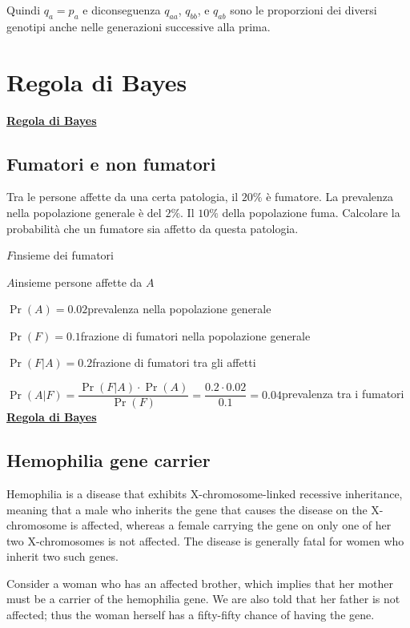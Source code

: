 \documentclass[11pt,openany]{book}
\begin{document}
Quindi $q_a=p_a$ e diconseguenza $q_{aa}$, $q_{bb}$, e $q_{ab}$ sono le proporzioni dei diversi genotipi anche nelle generazioni successive alla prima.


\clearpage\section{Regola di Bayes}
\label{Bayes}
\hfill\textbf{{\color{brown}\hyperref[RegolaBayes]{Regola di Bayes} \faShare}}
\subsection{Fumatori e non fumatori}
\label{Fumatori_Bayes}


Tra le persone affette da una certa patologia, il $20\%$ è fumatore. La prevalenza nella popolazione generale è del $2\%$. Il $10\%$ della popolazione fuma. Calcolare la probabilità che un fumatore sia affetto da questa patologia.


$F$\hfill insieme dei fumatori

$A$\hfill insieme persone affette da $A$

$\Pr(A)=0.02$\hfill prevalenza nella popolazione generale

$\Pr(F)=0.1$\hfill frazione di fumatori nella popolazione generale

$\Pr(F|A)=0.2$\hfill frazione di fumatori tra gli affetti

$\Pr(A|F)=\dfrac{\Pr(F|A)\cdot \Pr(A)}{\Pr(F)}=\dfrac{0.2\cdot0.02}{0.1}=0.04$\hfill prevalenza tra i fumatori
\clearpage\hfill
\hfill\textbf{{\color{brown}\hyperref[RegolaBayes]{Regola di Bayes} \faShare}}
\subsection{Hemophilia gene carrier }
\label{Hemophilia}

Hemophilia is a disease that exhibits X-chromosome-linked recessive inheritance, meaning that a male who inherits the gene that causes the disease on the X-chromosome is affected, whereas a
female carrying the gene on only one of her two X-chromosomes is not affected. The disease is generally fatal for women who inherit two such genes.

Consider a woman who has an affected brother, which implies that her mother must be a carrier of the hemophilia gene. We are also told that her father is not affected; thus the woman herself has a fifty-fifty chance of having the gene.
\end{document}
